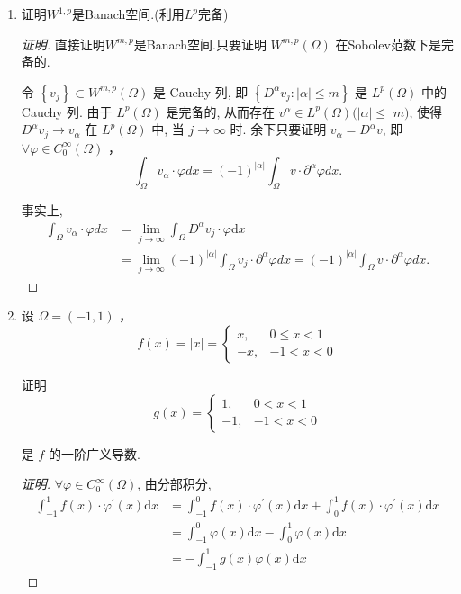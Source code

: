 \documentclass[12pt,a4paper]{article}
\begin{document}
\begin{enumerate}
\begin{proof}[证明]
		\end{proof}
		
		\item 证明$W^{1,p}$是Banach空间.(利用$L^p$完备)
		
		\begin{proof}[证明]
			
			直接证明$W^{m,p}$是Banach空间.只要证明 $W^{m, p}(\Omega)$ 在Sobolev范数下是完备的.
			
			令 $\left\{v_j\right\} \subset W^{m, p}(\Omega)$ 是 Cauchy 列, 即 $\left\{D^\alpha v_j:|\alpha| \leq m\right\}$ 是 $L^p(\Omega)$ 中的 Cauchy 列. 由于 $L^p(\Omega)$ 是完备的, 从而存在 $v^\alpha \in L^p(\Omega)(|\alpha| \leq$ $m)$, 使得 $D^\alpha v_j \rightarrow v_\alpha$ 在 $L^p(\Omega)$ 中, 当 $j \rightarrow \infty$ 时. 余下只要证明 $v_\alpha=D^\alpha v$, 即 $\forall \varphi \in C_0^{\infty}(\Omega)$ ，
			$$
			\int_{\Omega} v_\alpha \cdot \varphi d x=(-1)^{|\alpha|} \int_{\Omega} v \cdot \partial^\alpha \varphi d x .
			$$
			
			事实上,
			$$
			\begin{aligned}
				\int_{\Omega} v_\alpha \cdot \varphi d x & =\lim _{j \rightarrow \infty} \int_{\Omega} D^\alpha v_j \cdot \varphi \mathrm{d} x \\
				& =\lim _{j \rightarrow \infty}(-1)^{|\alpha|} \int_{\Omega} v_j \cdot \partial^\alpha \varphi d x=(-1)^{|\alpha|} \int_{\Omega} v \cdot \partial^\alpha \varphi d x.
			\end{aligned}
			$$
		\end{proof}
		
		\item 设 $\Omega=(-1,1)$ ，
		$$
		f(x)=|x|= \begin{cases}x, & 0 \leq x<1 \\ -x, & -1<x<0\end{cases}
		$$
		
		证明
		$$
		g(x)= \begin{cases}1, & 0<x<1 \\ -1, & -1<x<0\end{cases}
		$$
		
		是 $f$ 的一阶广义导数.
		
		\begin{proof}[证明]
			$\forall \varphi \in C_0^{\infty}(\Omega)$, 由分部积分,
			$$
			\begin{aligned}
				\int_{-1}^1 f(x) \cdot \varphi^{\prime}(x) \mathrm{d} x & =\int_{-1}^0 f(x) \cdot \varphi^{\prime}(x) \mathrm{d} x+\int_0^1 f(x) \cdot \varphi^{\prime}(x) \mathrm{d} x \\
				& =\int_{-1}^0 \varphi(x) \mathrm{d} x-\int_0^1 \varphi(x) \mathrm{d} x \\
				& =-\int_{-1}^1 g(x) \varphi(x) \mathrm{d} x
			\end{aligned}
			$$
			

\end{proof}
\end{enumerate}
\end{document}
